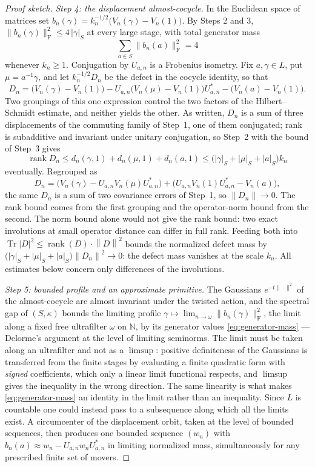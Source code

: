 \documentclass[11pt]{amsart}
\theoremstyle{definition}
\theoremstyle{remark}
\theoremstyle{plain}
\newcommand{\N}{\mathbb N}
\newcommand{\opnorm}[1]{\left\lVert #1\right\rVert}
\begin{document}
\begin{proof}[Proof sketch]
\emph{Step 4: the displacement almost-cocycle.}  In the Euclidean
space of matrices set
$b_n(\gamma)=k_n^{-1/2}\bigl(V_n(\gamma)-V_n(1)\bigr)$.  By Steps 2
and 3, $\|b_n(\gamma)\|_{\mathrm{F}}^2\le4\,|\gamma|_S$ at every
large stage, with total generator mass
\begin{equation}\label{eq:generator-mass}
  \sum_{a\in S}\|b_n(a)\|_{\mathrm{F}}^2=4
\end{equation}
whenever $k_n\ge1$.  Conjugation by $U_{a,n}$ is a Frobenius isometry.
Fix $a,\gamma\in L$, put $\mu=a^{-1}\gamma$, and let $k_n^{-1/2}D_n$ be
the defect in the cocycle identity, so that
\[
  D_n=\bigl(V_n(\gamma)-V_n(1)\bigr)
  -U_{a,n}\bigl(V_n(\mu)-V_n(1)\bigr)U_{a,n}^{*}
  -\bigl(V_n(a)-V_n(1)\bigr).
\]
Two groupings of this one expression control the two factors of the
Hilbert--Schmidt estimate, and neither yields the other.  As written,
$D_n$ is a sum of three displacements of the commuting family of
Step~1, one of them conjugated; rank is subadditive and invariant
under unitary conjugation, so Step~2 with the bound of Step~3 gives
\[
  \operatorname{rank}D_n\le d_n(\gamma,1)+d_n(\mu,1)+d_n(a,1)
  \le\bigl(|\gamma|_S+|\mu|_S+|a|_S\bigr)k_n
\]
eventually.  Regrouped as
\[
  D_n=\bigl(V_n(\gamma)-U_{a,n}V_n(\mu)U_{a,n}^{*}\bigr)
  +\bigl(U_{a,n}V_n(1)U_{a,n}^{*}-V_n(a)\bigr),
\]
the same $D_n$ is a sum of two covariance errors of Step~1, so
$\opnorm{D_n}\to0$.  The rank bound comes from the first grouping and
the operator-norm bound from the second.  The norm bound alone would
not give the rank bound: two exact involutions at small operator
distance can differ in full rank.  Feeding both into
$\operatorname{Tr}|D|^2\le\operatorname{rank}(D)\cdot\opnorm{D}^2$
bounds the normalized defect mass by
$\bigl(|\gamma|_S+|\mu|_S+|a|_S\bigr)\opnorm{D_n}^2\to0$: the defect
mass vanishes at the scale $k_n$.  All estimates below concern only
differences of the involutions.

\emph{Step 5: bounded profile and an approximate primitive.}  The
Gaussians $e^{-t\|\cdot\|^2}$ of the almost-cocycle are almost
invariant under the twisted action, and the spectral gap of
$(S,\kappa)$ bounds the limiting profile
$\gamma\mapsto\lim_{n\to\omega}\|b_n(\gamma)\|_{\mathrm F}^2$, the limit
along a fixed free ultrafilter $\omega$ on $\N$, by its
generator values \eqref{eq:generator-mass} --- Delorme's argument at
the level of limiting seminorms.  The limit must be taken along an
ultrafilter and not as a $\limsup$: positive definiteness of the
Gaussians is transferred from the finite stages by evaluating a finite
quadratic form with \emph{signed} coefficients, which only a linear
limit functional respects, and $\limsup$ gives the inequality in the
wrong direction.  The same linearity is what makes
\eqref{eq:generator-mass} an identity in the limit rather than an
inequality.  Since $L$ is countable one could instead pass to a
subsequence along which all the limits exist.  A circumcenter of the displacement
orbit, taken at the level of bounded sequences, then produces one
bounded sequence $(w_n)$ with
$b_n(a)\approx w_n-U_{a,n}w_nU_{a,n}^{*}$ in limiting normalized mass,
simultaneously for any prescribed finite set of movers.


\end{proof}
\end{document}

